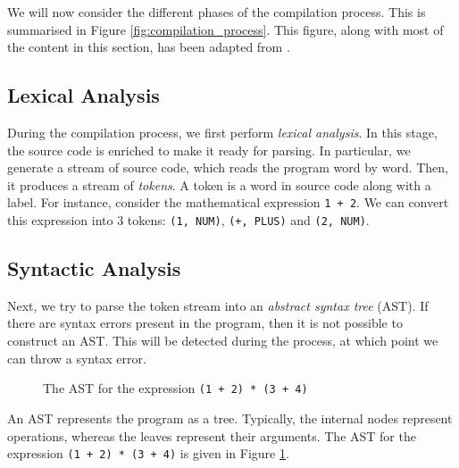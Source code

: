 We will now consider the different phases of the compilation process. This is summarised in Figure \ref{fig:compilation_process}. This figure, along with most of the content in this section, has been adapted from \cite{aho2007compilers}.

\subsection{Lexical Analysis}    
During the compilation process, we first perform \emph{lexical analysis}. In this stage, the source code is enriched to make it ready for parsing. In particular, we generate a stream of source code, which reads the program word by word. Then, it produces a stream of \emph{tokens}. A token is a word in source code along with a label. For instance, consider the mathematical expression \texttt{1 + 2}. We can convert this expression into 3 tokens: \texttt{(1, NUM)}, \texttt{(+, PLUS)} and \texttt{(2, NUM)}. 

\subsection{Syntactic Analysis}

Next, we try to parse the token stream into an \emph{abstract syntax tree} (AST). If there are syntax errors present in the program, then it is not possible to construct an AST. This will be detected during the process, at which point we can throw a syntax error.

\begin{figure}[htb]
    \centering
    \caption{The AST for the expression \texttt{(1 + 2) * (3 + 4)}}
    \label{fig:AST_example}
\end{figure}

An AST represents the program as a tree. Typically, the internal nodes represent operations, whereas the leaves represent their arguments. The AST for the expression \texttt{(1 + 2) * (3 + 4)} is given in Figure \ref{fig:AST_example}.

